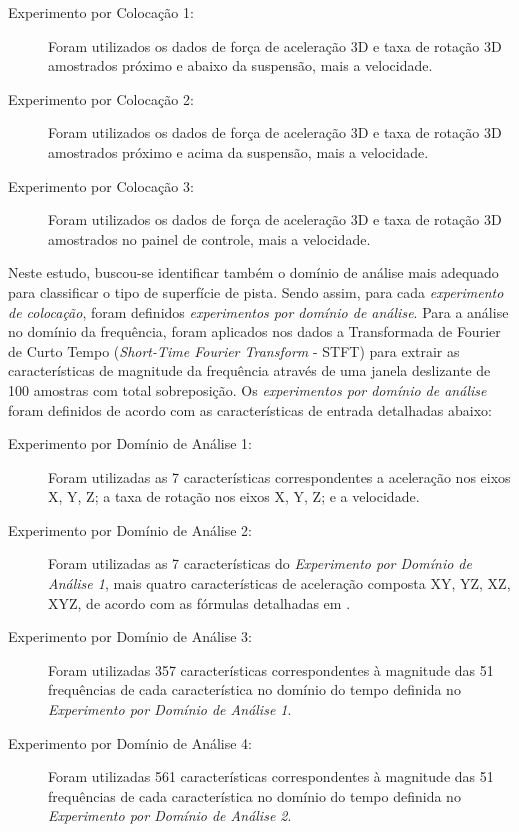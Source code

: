 \begin{description}
	
	\item[Experimento por Colocação 1:] Foram utilizados os dados de força de aceleração 3D e taxa de rotação 3D amostrados próximo e abaixo da suspensão, mais a velocidade.
    
    \item[Experimento por Colocação 2:] Foram utilizados os dados de força de aceleração 3D e taxa de rotação 3D amostrados próximo e acima da suspensão, mais a velocidade.
    
    \item[Experimento por Colocação 3:] Foram utilizados os dados de força de aceleração 3D e taxa de rotação 3D amostrados no painel de controle, mais a velocidade.
    
\end{description}

Neste estudo, buscou-se identificar também o domínio de análise mais adequado para classificar o tipo de superfície de pista. Sendo assim, para cada \emph{experimento de colocação}, foram definidos \emph{experimentos por domínio de análise}. Para a análise no domínio da frequência, foram aplicados nos dados a Transformada de Fourier de Curto Tempo (\textit{Short-Time Fourier Transform} - STFT) para extrair as características de magnitude da frequência através de uma janela deslizante de 100 amostras com total sobreposição. Os \emph{experimentos por domínio de análise} foram definidos de acordo com as características de entrada detalhadas abaixo:

\begin{description}

    \item[Experimento por Domínio de Análise 1:] Foram utilizadas as 7 características correspondentes a aceleração nos eixos X, Y, Z; a taxa de rotação nos eixos X, Y, Z; e a velocidade.
    
    \item[Experimento por Domínio de Análise 2:] Foram utilizadas as 7 características do \emph{Experimento por Domínio de Análise 1}, mais quatro características de aceleração composta XY, YZ, XZ, XYZ, de acordo com as fórmulas detalhadas em \cite{Tan2019}.
    
    \item[Experimento por Domínio de Análise 3:] Foram utilizadas 357 características correspondentes à magnitude das 51 frequências de cada característica no domínio do tempo definida no \emph{Experimento por Domínio de Análise 1}.
    
    \item[Experimento por Domínio de Análise 4:] Foram utilizadas 561 características correspondentes à magnitude das 51 frequências de cada característica no domínio do tempo definida no \emph{Experimento por Domínio de Análise 2}.
    
\end{description}

